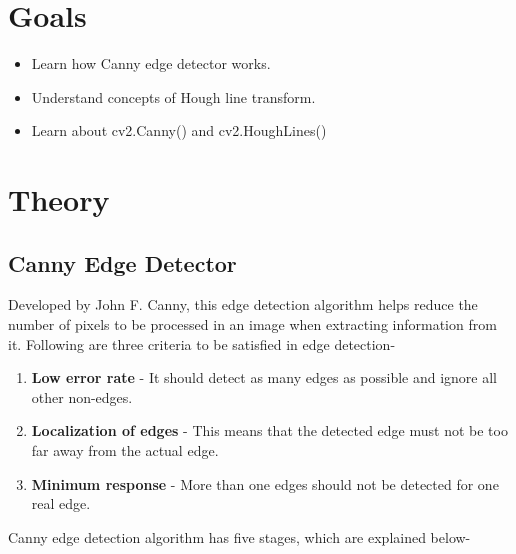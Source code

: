\documentclass[]{article}
\date{}
\providecommand{\tightlist}{%
  \setlength{\itemsep}{0pt}\setlength{\parskip}{0pt}}
\begin{document}
\section{Goals}\label{goals}

\begin{itemize}
\tightlist
\item
  Learn how Canny edge detector works.
\item
  Understand concepts of Hough line transform.
\item
  Learn about cv2.Canny() and cv2.HoughLines()
\end{itemize}

\section{Theory}\label{theory}

\subsection{Canny Edge Detector}\label{canny-edge-detector}

Developed by John F. Canny, this edge detection algorithm helps reduce
the number of pixels to be processed in an image when extracting
information from it. Following are three criteria to be satisfied in
edge detection-

\begin{enumerate}
\def\labelenumi{\arabic{enumi}.}
\tightlist
\item
  \textbf{Low error rate} - It should detect as many edges as possible
  and ignore all other non-edges.
\item
  \textbf{Localization of edges} - This means that the detected edge
  must not be too far away from the actual edge.
\item
  \textbf{Minimum response} - More than one edges should not be detected
  for one real edge.
\end{enumerate}

Canny edge detection algorithm has five stages, which are explained
below-
\end{document}

